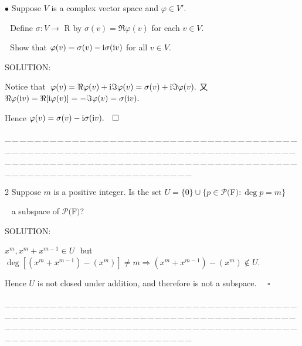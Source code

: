 \documentclass[a4paper, 11pt, UTF8]{article}
\def\i{\textup{i}}
\def\Po{\mathcal{P}}
\begin{document}
\begin{large}
{\small $\bullet$} {\timessl\Large 
Suppose $V$ is a complex vector space and $\varphi\in V'$.}\par\,\,
{\timessl\Large Define $σ:V\rightarrow$ {\timesbf R} by $\sigma(v) = \Re\varphi(v)$ for each $v\in V$.
}\par\,\,
{\timessl\Large Show that $\varphi(v)=\sigma(v)-\i\sigma(\i v)$ for all $v\in V$.
}\par
{\timesbf S\footnotesize{OLUTION:}}\par\quad
Notice that \,$\varphi(v)=\Re\varphi(v)+\i\Im\varphi(v)=\sigma(v)+\i\Im\varphi(v).$ 又 $\Re\varphi(\i v)=\Re[\i\varphi(v)]=-\Im\varphi(v)=\sigma(\i v).$\par\quad
Hence $\varphi(v)=\sigma(v)-\i\sigma(\i v).\quad\square$\par
\par
{\tiny \_\,\_\,\_\,\_\,\_\,\_\,\_\,\_\,\_\,\_\,\_\,\_\,\_\,\_\,\_\,\_\,\_\,\_\,\_\,\_\,\_\,\_\,\_\,\_\,\_\,\_\,\_\,\_\,\_\,\_\,\_\,\_\,\_\,\_\,\_\,\_\,\_\,\_\,\_\,\_\,\_\,\_\,\_\,\_\,\_\,\_\,\_\,\_\,\_\,\_\,\_\,\_\,\_\,\_\,\_\,\_\,\_\,\_\,\_\,\_\,\_\,\_\,\_\,\_\,\_\,\_\,\_\,\_\,\_\,\_\,\_\_\,\_\,\_\,\_\,\_\,\_\,\_\,\_\,\_\,\_\,\_\,\_\,\_\,\_\,\_\,\_\,\_\,\_\,\_\,\_\,\_\,\_\,\_\,\_\,\_\,\_\,\_\,\_\,\_\,\_\,\_\,\_\,\_\,\_\,\_\,\_\,\_\,\_\,\_\,\_\,\_\,\_\,\_\,\_\,\_\,\_\,\_\,\_\,\_\,\_\,\_\,\_\,\_\,\_\,\_\,\_\,\_\,\_\,\_\,\_\,\_\,\_\,\_\,\_\,\_\,\_\,\_\,\_\,\_\,\_\,\_}\par

{\timesbf\Large 2} {\timessl\Large 
Suppose $m$ is a positive integer. Is the set $U=\{0\}\cup\{p\in\Po(${\timesbf F}$):\deg p = m\}$
}\par\,\,\,
{\timessl\Large
 a subspace of $\Po(${\timesbf F}$)$?
}\par
{\timesbf S\footnotesize{OLUTION:}}\par\quad
$x^m,x^m+x^{m-1}\in U$ \,\,but\,\, $\deg[(x^m+x^{m-1})-(x^{m})]\neq m\Rightarrow (x^m+x^{m-1})-(x^{m})\not\in U.$\par\quad
Hence $U$ is not closed under addition, and therefore is not a subspace. $\quad\square$\par
{\tiny \_\,\_\,\_\,\_\,\_\,\_\,\_\,\_\,\_\,\_\,\_\,\_\,\_\,\_\,\_\,\_\,\_\,\_\,\_\,\_\,\_\,\_\,\_\,\_\,\_\,\_\,\_\,\_\,\_\,\_\,\_\,\_\,\_\,\_\,\_\,\_\,\_\,\_\,\_\,\_\,\_\,\_\,\_\,\_\,\_\,\_\,\_\,\_\,\_\,\_\,\_\,\_\,\_\,\_\,\_\,\_\,\_\,\_\,\_\,\_\,\_\,\_\,\_\,\_\,\_\,\_\,\_\,\_\,\_\,\_\,\_\_\,\_\,\_\,\_\,\_\,\_\,\_\,\_\,\_\,\_\,\_\,\_\,\_\,\_\,\_\,\_\,\_\,\_\,\_\,\_\,\_\,\_\,\_\,\_\,\_\,\_\,\_\,\_\,\_\,\_\,\_\,\_\,\_\,\_\,\_\,\_\,\_\,\_\,\_\,\_\,\_\,\_\,\_\,\_\,\_\,\_\,\_\,\_\,\_\,\_\,\_\,\_\,\_\,\_\,\_\,\_\,\_\,\_\,\_\,\_\,\_\,\_\,\_\,\_\,\_\,\_\,\_\,\_\,\_\,\_\,\_}\par


\end{large}
\end{document}
